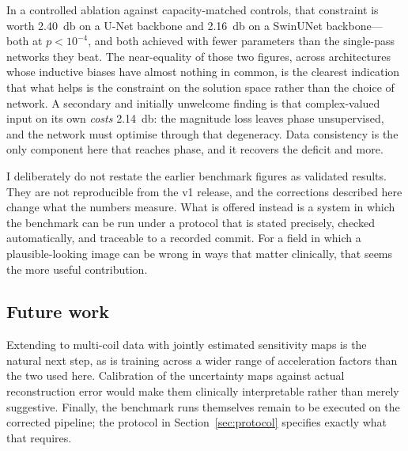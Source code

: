 \documentclass[11pt]{article}
\begin{document}
In a controlled ablation against capacity-matched controls, that constraint is
worth \SI{2.40}{\decibel} on a U-Net backbone and \SI{2.16}{\decibel} on a
SwinUNet backbone---both at $p < 10^{-4}$, and both achieved with fewer
parameters than the single-pass networks they beat. The near-equality of those
two figures, across architectures whose inductive biases have almost nothing in
common, is the clearest indication that what helps is the constraint on the
solution space rather than the choice of network. A secondary and initially
unwelcome finding is that complex-valued input on its own \emph{costs}
\SI{2.14}{\decibel}: the magnitude loss leaves phase unsupervised, and the
network must optimise through that degeneracy. Data consistency is the only
component here that reaches phase, and it recovers the deficit and more.

I deliberately do not restate the earlier benchmark figures as validated
results. They are not reproducible from the v1 release, and the
corrections described here change what the numbers measure. What is offered
instead is a system in which the benchmark can be run under a protocol that is
stated precisely, checked automatically, and traceable to a recorded commit. For
a field in which a plausible-looking image can be wrong in ways that matter
clinically, that seems the more useful contribution.

\subsection*{Future work}

Extending to multi-coil data with jointly estimated sensitivity maps is the
natural next step, as is training across a wider range of acceleration factors
than the two used here. Calibration of the uncertainty maps against actual
reconstruction error would make them clinically interpretable rather than merely
suggestive. Finally, the benchmark runs themselves remain to be executed on the
corrected pipeline; the protocol in Section~\ref{sec:protocol} specifies exactly
what that requires.
\end{document}
